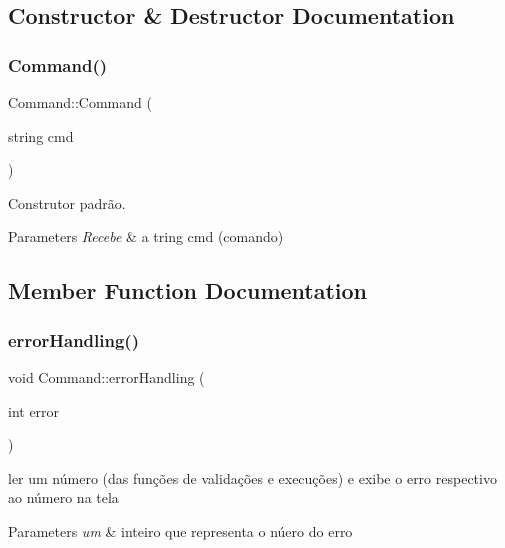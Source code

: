 \subsection{Constructor \& Destructor Documentation}
\mbox{\label{classCommand_aa66130359570f527b42300633e35f8c2}} 
\subsubsection{\texorpdfstring{Command()}{Command()}}
{\footnotesize\ttfamily Command\+::\+Command (\begin{DoxyParamCaption}\item[{string}]{cmd }\end{DoxyParamCaption})}



Construtor padrão. 


\begin{DoxyParams}{Parameters}
{\em Recebe} & a tring cmd (comando) \\
\hline
\end{DoxyParams}


\subsection{Member Function Documentation}
\mbox{\label{classCommand_adb45fb42d7bf3784bb5d9f85ea71941a}} 
\subsubsection{\texorpdfstring{error\+Handling()}{errorHandling()}}
{\footnotesize\ttfamily void Command\+::error\+Handling (\begin{DoxyParamCaption}\item[{int}]{error }\end{DoxyParamCaption})}



ler um número (das funções de validações e execuções) e exibe o erro respectivo ao número na tela 


\begin{DoxyParams}{Parameters}
{\em um} & inteiro que representa o núero do erro \\
\hline
\end{DoxyParams}
\mbox{\label{classCommand_ae9f0a3ba183b25d7824f70254df8a232}} 
